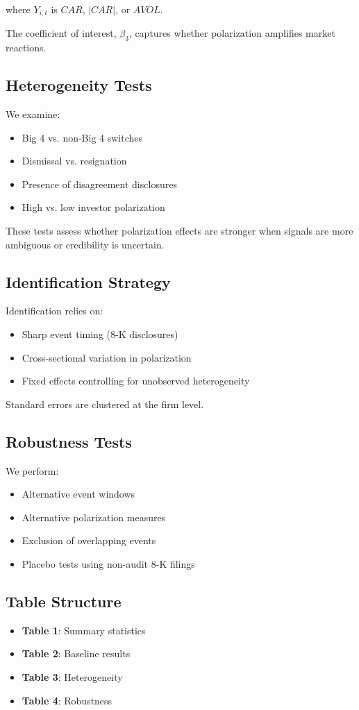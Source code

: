 where $Y_{i,t}$ is $CAR$, $|CAR|$, or $AVOL$.

The coefficient of interest, $\beta_3$, captures whether polarization amplifies market reactions.

\subsection{Heterogeneity Tests}

We examine:

\begin{itemize}
    \item Big 4 vs. non-Big 4 switches
    \item Dismissal vs. resignation
    \item Presence of disagreement disclosures
    \item High vs. low investor polarization
\end{itemize}

These tests assess whether polarization effects are stronger when signals are more ambiguous or credibility is uncertain.

\subsection{Identification Strategy}

Identification relies on:

\begin{itemize}
    \item Sharp event timing (8-K disclosures)
    \item Cross-sectional variation in polarization
    \item Fixed effects controlling for unobserved heterogeneity
\end{itemize}

Standard errors are clustered at the firm level.

\subsection{Robustness Tests}

We perform:

\begin{itemize}
    \item Alternative event windows
    \item Alternative polarization measures
    \item Exclusion of overlapping events
    \item Placebo tests using non-audit 8-K filings
\end{itemize}

\subsection{Table Structure}

\begin{itemize}
    \item \textbf{Table 1}: Summary statistics
    \item \textbf{Table 2}: Baseline results
    \item \textbf{Table 3}: Heterogeneity
    \item \textbf{Table 4}: Robustness
\end{itemize}